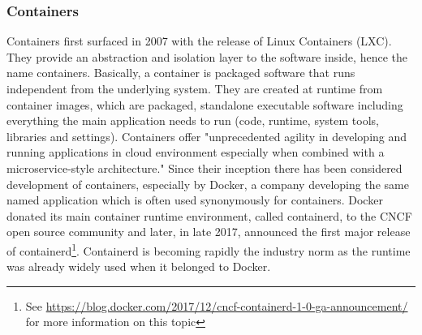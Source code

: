 \subsubsection{Containers} \label{sec:containers}
Containers first surfaced in 2007 with the release of Linux Containers (LXC). They provide an abstraction and isolation layer to the software inside, hence the name containers. Basically, a container is packaged software that runs independent from the underlying system. They are created at runtime from container images, which are packaged, standalone executable software including everything the main application needs to run (code, runtime, system tools, libraries and settings)\cite{containerDefinition:online}. Containers offer
"unprecedented agility in developing and running applications in cloud environment especially when combined with a microservice-style architecture."\cite{microserviceContainers} Since their inception there has been considered development of containers, especially by Docker, a company developing the same named application which is often used synonymously for containers. Docker donated its main container runtime environment, called containerd, to the CNCF open source community and later, in late 2017, announced the first major release of containerd\footnote{See \url{https://blog.docker.com/2017/12/cncf-containerd-1-0-ga-announcement/} for more information on this topic}. Containerd is becoming rapidly the industry norm as the runtime was already widely used when it belonged to Docker.

